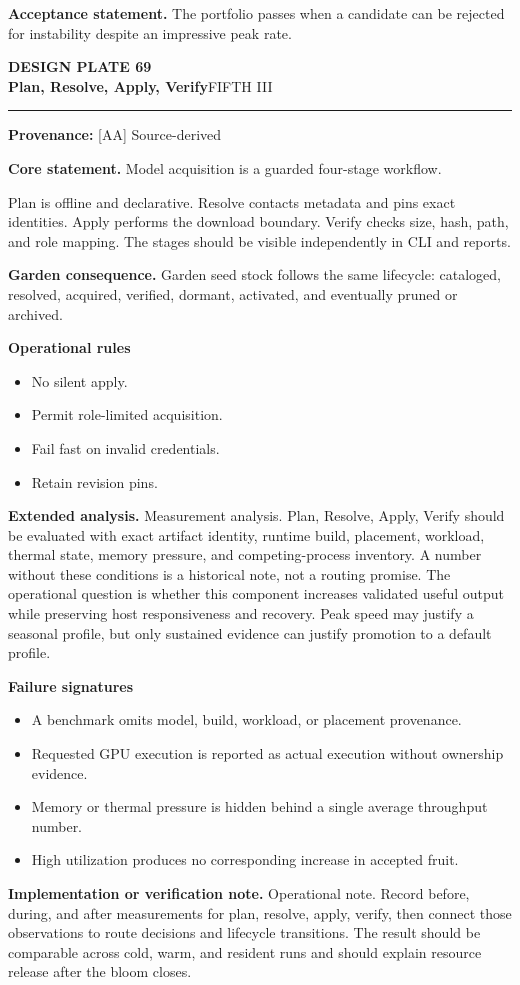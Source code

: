 \documentclass[10pt,letterpaper,oneside]{article}
\newcommand{\prov}[1]{\textcolor{gardenBlue}{\sffamily\footnotesize\textbf{Provenance:} #1}}
\newcommand{\platetitle}[3]{%
  \begin{minipage}[t][0.54in][t]{\textwidth}
  {\sffamily\bfseries\color{gardenDeep}\fontsize{9}{10}\selectfont DESIGN PLATE #1}\\[-1pt]
  {\sffamily\bfseries\color{gardenInk}\fontsize{16.5}{18}\selectfont #2}\hfill{\sffamily\color{gardenGreen}\large #3}
  \end{minipage}\vspace{-2pt}\hrule\vspace{5pt}}
\begin{document}
\begin{acceptbox}
\textbf{Acceptance statement.} The portfolio passes when a candidate can be rejected for instability despite an impressive peak rate.
\end{acceptbox}
\newpage
\platetitle{69}{Plan, Resolve, Apply, Verify}{FIFTH III}
\prov{[AA] Source-derived}
\fontsize{8.85}{10.45}\selectfont
\begin{corebox}
\textbf{Core statement.} Model acquisition is a guarded four-stage workflow.
\end{corebox}
Plan is offline and declarative. Resolve contacts metadata and pins exact identities. Apply performs the download boundary. Verify checks size, hash, path, and role mapping. The stages should be visible independently in CLI and reports.

\textbf{Garden consequence.} Garden seed stock follows the same lifecycle: cataloged, resolved, acquired, verified, dormant, activated, and eventually pruned or archived.

\textbf{Operational rules}
\begin{itemize}
\item No silent apply.
\item Permit role-limited acquisition.
\item Fail fast on invalid credentials.
\item Retain revision pins.
\end{itemize}
\textbf{Extended analysis.} Measurement analysis. Plan, Resolve, Apply, Verify should be evaluated with exact artifact identity, runtime build, placement, workload, thermal state, memory pressure, and competing-process inventory. A number without these conditions is a historical note, not a routing promise. The operational question is whether this component increases validated useful output while preserving host responsiveness and recovery. Peak speed may justify a seasonal profile, but only sustained evidence can justify promotion to a default profile.

\textbf{Failure signatures}
\begin{itemize}
\item A benchmark omits model, build, workload, or placement provenance.
\item Requested GPU execution is reported as actual execution without ownership evidence.
\item Memory or thermal pressure is hidden behind a single average throughput number.
\item High utilization produces no corresponding increase in accepted fruit.
\end{itemize}
\textbf{Implementation or verification note.} Operational note. Record before, during, and after measurements for plan, resolve, apply, verify, then connect those observations to route decisions and lifecycle transitions. The result should be comparable across cold, warm, and resident runs and should explain resource release after the bloom closes.
\end{document}

